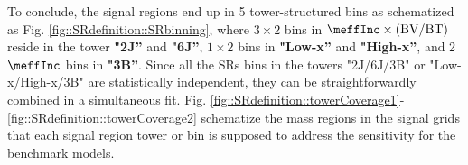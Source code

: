 To conclude, the signal regions end up in 5 tower-structured bins as schematized as Fig. \ref{fig::SRdefinition::SRbinning}, where $3 \times 2$ bins in $\meffInc \times \mathrm{(BV/BT)}$ reside in the tower \textbf{"2J''} and \textbf{"6J''}, $1 \times 2$ bins in \textbf{"Low-x''} and \textbf{"High-x''}, and 2 $\meffInc$ bins in \textbf{"3B''}. Since all the SRs bins in the towers "2J/6J/3B" or "Low-x/High-x/3B" are statistically independent, they can be straightforwardly combined in a simultaneous fit. 
%
Fig. \ref{fig::SRdefinition::towerCoverage1}-\ref{fig::SRdefinition::towerCoverage2} schematize the mass regions in the signal grids that each signal region tower or bin is supposed to address the sensitivity for the benchmark models.


